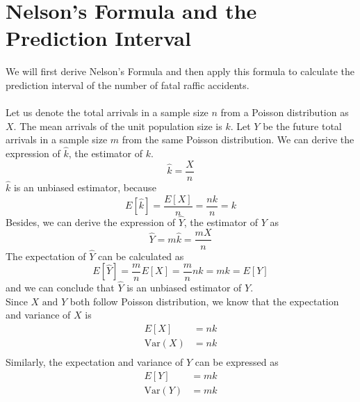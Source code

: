 \documentclass[a4paper,12pt]{article}
\begin{document}
\section{Nelson's Formula and the Prediction Interval}
\noindent We will first derive Nelson's Formula and then apply this formula to calculate the prediction interval of the number of fatal raffic accidents. \\\\
Let us denote the total arrivals in a sample size $n$ from a Poisson distribution as $X$. The mean arrivals of the unit population size is $k$. Let $Y$ be the future total arrivals in a sample size $m$ from the same Poisson distribution. We can derive the expression of $\widehat{k}$, the estimator of $k$.\\
\begin{equation}\label{1}
\widehat{k}=\frac{X}{n}
\end{equation}
$\widehat{k}$ is an unbiased estimator, because
\begin{equation}\label{2}
E[\widehat{k}]=\frac{E[X]}{n}=\frac{nk}{n}=k
\end{equation}
Besides, we can derive the expression of $\widehat{Y}$, the estimator of $Y$ as 
\begin{equation}\label{3}
\widehat{Y}=m\widehat{k}=\frac{mX}{n}
\end{equation}
The expectation of $\widehat{Y}$ can be calculated as
\begin{equation}\label{4}
E[\widehat{Y}]=\frac{m}{n}E[X]=\frac{m}{n}nk=mk=E[Y]
\end{equation}
and we can conclude that $\widehat{Y}$ is an unbiased estimator of $Y$.\\
Since $X\text{ and }Y$ both follow Poisson distribution, we know that the expectation and variance of $X$ is 
\begin{equation}\label{5}
\begin{aligned}
E[X]&=nk\\
\text{Var} (X)&=nk\\
\end{aligned}
\end{equation}
Similarly, the expectation and variance of $Y$ can be expressed as 
\begin{equation}\label{6}
\begin{aligned}
E[Y]&=mk\\
\text{Var} (Y)&=mk
\end{aligned}
\end{equation}
\end{document}
